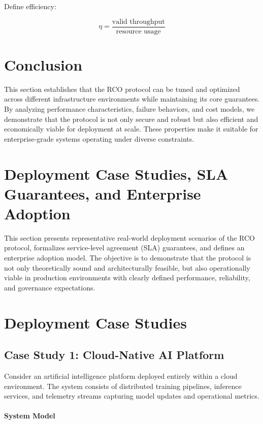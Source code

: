 Define efficiency:

\begin{equation}
\eta = \frac{\text{valid throughput}}{\text{resource usage}}
\end{equation}

\section{Conclusion}

This section establishes that the RCO protocol can be tuned and optimized across different infrastructure environments while maintaining its core guarantees. By analyzing performance characteristics, failure behaviors, and cost models, we demonstrate that the protocol is not only secure and robust but also efficient and economically viable for deployment at scale. These properties make it suitable for enterprise-grade systems operating under diverse constraints.

\section{Deployment Case Studies, SLA Guarantees, and Enterprise Adoption}

This section presents representative real-world deployment scenarios of the RCO protocol, formalizes service-level agreement (SLA) guarantees, and defines an enterprise adoption model. The objective is to demonstrate that the protocol is not only theoretically sound and architecturally feasible, but also operationally viable in production environments with clearly defined performance, reliability, and governance expectations.

\section{Deployment Case Studies}

\subsection{Case Study 1: Cloud-Native AI Platform}

Consider an artificial intelligence platform deployed entirely within a cloud environment. The system consists of distributed training pipelines, inference services, and telemetry streams capturing model updates and operational metrics.

\paragraph{System Model}

